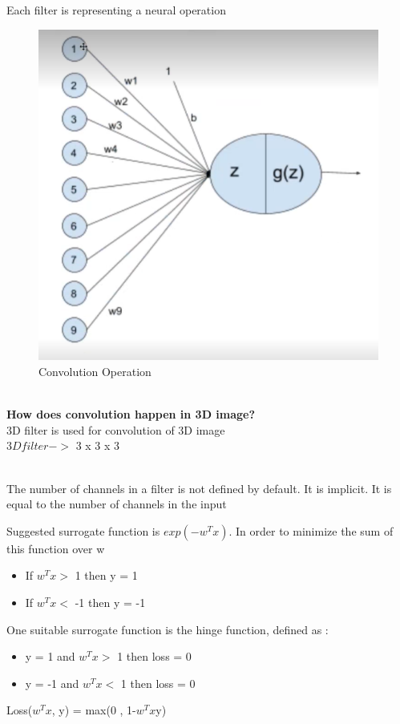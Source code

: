 \documentclass[11pt, twosides]{article}
\begin{document}
Each filter is representing a neural operation\\
\begin{figure}[H]
\centering
\caption{Convolution Operation}
\includegraphics[scale = 0.6]{419sc3.png}
\end{figure}
\\
\textbf{How does convolution happen in 3D image?}
\\ 
3D filter is used for convolution of 3D image\\

$3D filter -> $ 3 x 3 x 3 

\\
The number of channels in a filter is not defined by default. It is implicit. It is equal to the number of channels in the input
\newpage

Suggested surrogate function is $exp(-w^T x)$. In order to minimize the sum of this function over w
\begin{itemize}
    \item If $w^T x >$ 1 then y = 1
    \item If $w^T x <$ -1 then y = -1
\end{itemize}
One suitable surrogate function is the hinge function, defined as :
\begin{itemize}
    \item y = 1 and  $w^T x >$ 1 then loss = 0
    \item y = -1 and  $w^T x <$ 1 then loss = 0

\end{itemize}
 Loss($w^Tx$, y) = max(0 , 1-$w^Tx$y)
 
\end{document}
